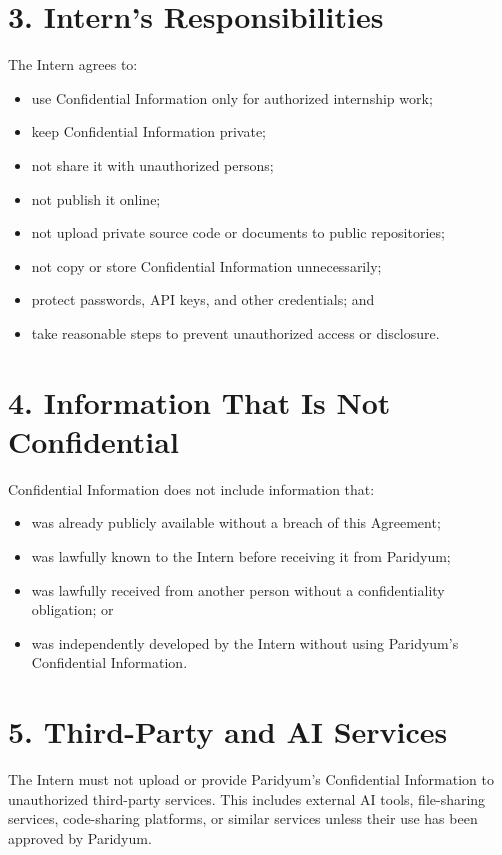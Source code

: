 \documentclass{paridyum}
\begin{document}
\section*{3. Intern's Responsibilities}
The Intern agrees to:
\begin{itemize}[leftmargin=*, noitemsep]
    \item use Confidential Information only for authorized internship work;
    \item keep Confidential Information private;
    \item not share it with unauthorized persons;
    \item not publish it online;
    \item not upload private source code or documents to public repositories;
    \item not copy or store Confidential Information unnecessarily;
    \item protect passwords, API keys, and other credentials; and
    \item take reasonable steps to prevent unauthorized access or disclosure.
\end{itemize}

\section*{4. Information That Is Not Confidential}
Confidential Information does not include information that:
\begin{itemize}[leftmargin=*, noitemsep]
    \item was already publicly available without a breach of this Agreement;
    \item was lawfully known to the Intern before receiving it from Paridyum;
    \item was lawfully received from another person without a confidentiality
          obligation; or
    \item was independently developed by the Intern without using Paridyum's
          Confidential Information.
\end{itemize}

\section*{5. Third-Party and AI Services}
The Intern must not upload or provide Paridyum's Confidential Information to
unauthorized third-party services. This includes external AI tools, file-sharing
services, code-sharing platforms, or similar services unless their use has been
approved by Paridyum.
\end{document}
